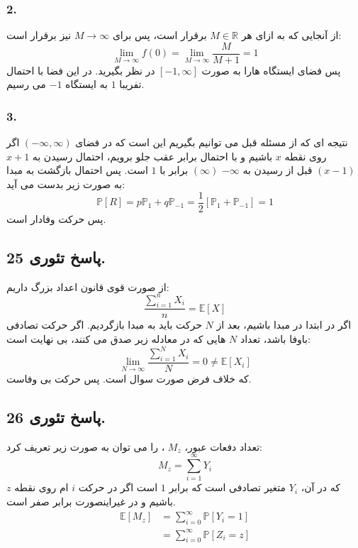 \documentclass[]{article}
\begin{document}
\subsubsection{2.}
از آنجایی که به ازای هر 
$M \in \mathbb{R}$
برقرار است، پس برای 
$M \longrightarrow \infty$
نیز برقرار است:
\begin{equation}
	\nonumber
	\lim_{M\rightarrow\infty}f(0) = \lim_{M\rightarrow \infty}\frac{M}{M+1} = 1
\end{equation}
پس فضای ایستگاه هارا به صورت 
$[-1, \infty]$
در نظر بگیرید. در این فضا با احتمال تفریبا $1$ به ایستگاه $-1$ می رسیم.
\subsubsection{3.}
نتیجه ای که از مسئله قبل می توانیم بگیریم این است که در فضای 
$(-\infty, \infty)$
اگر روی نقطه $x$ باشیم و با احتمال برابر عقب جلو برویم، احتمال رسیدن به 
$x+1$
$(x-1)$
قبل از رسیدن به 
$-\infty$
$(\infty)$
برابر با $1$ است. پس احتمال بازگشت به مبدا به صورت زیر بدست می آید:
\begin{equation}
	\nonumber
	\mathbb{P}[R] = p \mathbb{P}_1 + q \mathbb{P}_{-1} = \frac{1}{2} [\mathbb{P}_1 + \mathbb{P}_{-1}] = 1
\end{equation}
پس حرکت وفادار است.
\newpage
\subsection{پاسخ تئوری 25.}
از صورت قوی قانون اعداد بزرگ داریم:
\begin{equation}
	\nonumber
	\frac{\sum_{i = 1}^{n}X_i}{n} = \mathbb{E}[X]
\end{equation}
اگر در ابتدا در مبدا باشیم، بعد از $N$ حرکت باید به مبدا بازگردیم. اگر حرکت تصادفی باوفا باشد، تعداد $N$ هایی که در معادله زیر صدق می کنند، بی نهایت است:
\begin{equation}
	\nonumber
	\lim_{N\rightarrow\infty} \frac{\sum_{i=1}^{N}X_i}{N} = 0 \neq \mathbb{E}[X_i]
\end{equation}
که خلاف فرض صورت سوال است. پس حرکت بی وفاست.
\newpage
\subsection{پاسخ تئوری 26.}
تعداد دفعات عبور،
$M_z$
، را می توان به صورت زیر تعریف کرد:
\begin{equation}
	\nonumber
	M_z = \sum_{i = 1}^{\infty} Y_i
\end{equation}
که در آن، 
$Y_i$
 متغیر تصادفی است که برابر $1$ است اگر در حرکت $i$ ام روی نقطه $z$ باشیم و در غیراینصورت برابر صفر است.
 \begin{equation}
 	\nonumber
 	\begin{split}
		 \mathbb{E}[M_z] &= \sum_{i = 0}^{\infty} \mathbb{P}[Y_i = 1] \\
		 &= \sum_{i=0}^{\infty} \mathbb{P}[Z_i = z]		
 	\end{split}
 \end{equation} 
 \newpage
\end{document}
